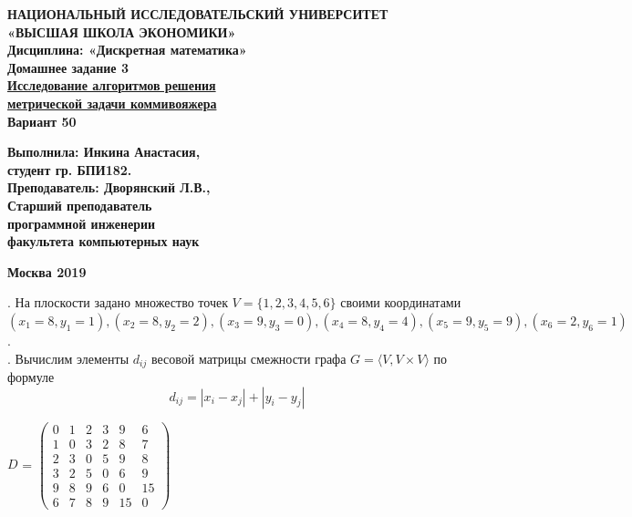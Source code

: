 \documentclass[12pt]{article}
\begin{document}
	\begin{titlepage}
		\begin{center}
			\textbf{
				НАЦИОНАЛЬНЫЙ ИССЛЕДОВАТЕЛЬСКИЙ УНИВЕРСИТЕТ\\
				«ВЫСШАЯ ШКОЛА ЭКОНОМИКИ»\\
				Дисциплина: «Дискретная математика»\\
			}
			\vspace{5cm}
			\textbf{
				Домашнее задание 3\\
				\underline{Исследование алгоритмов решения}
				\\
				\underline{метрической задачи коммивояжера}
				\\
				Вариант 50\\
			}
		\end{center}
		\vspace{5cm}
		\begin{flushright}
			\textbf{
				Выполнила: Инкина Анастасия,\\
				студент гр. БПИ182.\\
				\vspace{5mm}
				Преподаватель: Дворянский Л.В.,\\
				Старший преподаватель\\
				программной инженерии\\
				факультета компьютерных наук\\
			}
		\end{flushright}
		\vspace{7cm}
		\begin{center}
			\textbf{Москва 2019}
		\end{center}
	\end{titlepage}

	\newpage
	\clearpage
	\setcounter{page}{2}
	. На плоскости задано множество точек 
	$V = \{1, 2, 3, 4, 5, 6\}$
	своими координатами\\
        $(x_{1} = 8, y_{1} = 1), (x_{2} = 8, y_{2} = 2), (x_{3} = 9, y_{3} = 0), (x_{4} = 8, y_{4} = 4), (x_{5} = 9, y_{5} = 9), (x_{6} = 2, y_{6} = 1)$
        .\\

	
	\vspace{5mm}
	. Вычислим элементы $d_{ij}$ весовой матрицы смежности графа
	$G = \langle V, V \times V \rangle$
	по формуле
	$$d_{ij} = |x_i - x_j| + |y_i - y_j|$$
\begin{flushleft}
$D$ =
$
\begin{pmatrix}
 0 & 1 & 2 & 3 & 9 & 6 \\
1 &  0 & 3 & 2 & 8 & 7 \\
2 & 3 &  0 & 5 & 9 & 8 \\
3 & 2 & 5 &  0 & 6 & 9 \\
9 & 8 & 9 & 6 &  0 & 15 \\
6 & 7 & 8 & 9 & 15 & 0 
\end{pmatrix}
$
\end{flushleft}
	
\end{document}
